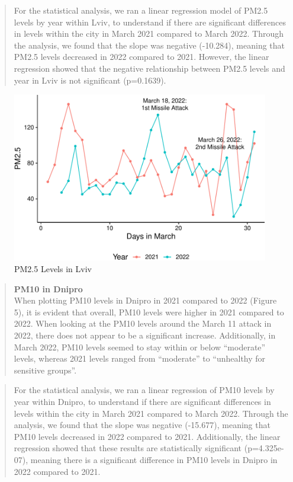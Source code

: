\documentclass[
  12pt,
]{article}
\begin{document}
\begin{quote}
For the statistical analysis, we ran a linear regression model of PM2.5
levels by year within Lviv, to understand if there are significant
differences in levels within the city in March 2021 compared to March
2022. Through the analysis, we found that the slope was negative
(-10.284), meaning that PM2.5 levels decreased in 2022 compared to 2021.
However, the linear regression showed that the negative relationship
between PM2.5 levels and year in Lviv is not significant (p=0.1639).
\end{quote}

\begin{figure}
\centering
\includegraphics{Fontanie_Gordon_Weinberg_Project_files/figure-latex/visualizing PM25 in Lviv-1.pdf}
\caption{PM2.5 Levels in Lviv}
\end{figure}

\newpage

\begin{quote}
\textbf{PM10 in Dnipro}\\
When plotting PM10 levels in Dnipro in 2021 compared to 2022 (Figure 5),
it is evident that overall, PM10 levels were higher in 2021 compared to
2022. When looking at the PM10 levels around the March 11 attack in
2022, there does not appear to be a significant increase. Additionally,
in March 2022, PM10 levels seemed to stay within or below ``moderate''
levels, whereas 2021 levels ranged from ``moderate'' to ``unhealthy for
sensitive groups''.
\end{quote}

\begin{quote}
For the statistical analysis, we ran a linear regression of PM10 levels
by year within Dnipro, to understand if there are significant
differences in levels within the city in March 2021 compared to March
2022. Through the analysis, we found that the slope was negative
(-15.677), meaning that PM10 levels decreased in 2022 compared to 2021.
Additionally, the linear regression showed that these results are
statistically significant (p=4.325e-07), meaning there is a significant
difference in PM10 levels in Dnipro in 2022 compared to 2021.
\end{quote}
\end{document}
